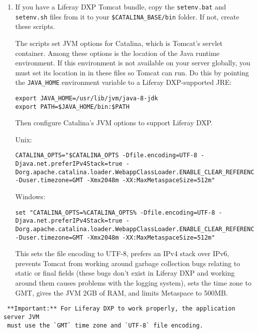 \begin{enumerate}
\def\labelenumi{\arabic{enumi}.}
\item
  If you have a Liferay DXP Tomcat bundle, copy the \texttt{setenv.bat}
  and \texttt{setenv.sh} files from it to your
  \texttt{\$CATALINA\_BASE/bin} folder. If not, create these scripts.

  The scripts set JVM options for Catalina, which is Tomcat's servlet
  container. Among these options is the location of the Java runtime
  environment. If this environment is not available on your server
  globally, you must set its location in in these files so Tomcat can
  run. Do this by pointing the \texttt{JAVA\_HOME} environment variable
  to a Liferay DXP-supported JRE:

\begin{verbatim}
export JAVA_HOME=/usr/lib/jvm/java-8-jdk
export PATH=$JAVA_HOME/bin:$PATH
\end{verbatim}

  Then configure Catalina's JVM options to support Liferay DXP.

  Unix:

\begin{verbatim}
CATALINA_OPTS="$CATALINA_OPTS -Dfile.encoding=UTF-8 -Djava.net.preferIPv4Stack=true -Dorg.apache.catalina.loader.WebappClassLoader.ENABLE_CLEAR_REFERENCES=false -Duser.timezone=GMT -Xmx2048m -XX:MaxMetaspaceSize=512m"
\end{verbatim}

  Windows:

\begin{verbatim}
set "CATALINA_OPTS=%CATALINA_OPTS% -Dfile.encoding=UTF-8 -Djava.net.preferIPv4Stack=true -Dorg.apache.catalina.loader.WebappClassLoader.ENABLE_CLEAR_REFERENCES=false -Duser.timezone=GMT -Xmx2048m -XX:MaxMetaspaceSize=512m"
\end{verbatim}

  This sets the file encoding to UTF-8, prefers an IPv4 stack over IPv6,
  prevents Tomcat from working around garbage collection bugs relating
  to static or final fields (these bugs don't exist in Liferay DXP and
  working around them causes problems with the logging system), sets the
  time zone to GMT, gives the JVM 2GB of RAM, and limits Metaspace to
  500MB.
\end{enumerate}

\noindent\hrulefill

\begin{verbatim}
 **Important:** For Liferay DXP to work properly, the application server JVM
 must use the `GMT` time zone and `UTF-8` file encoding.
\end{verbatim}

